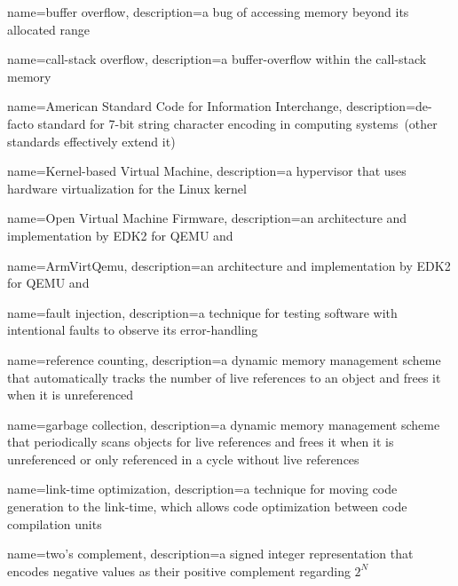 {
  name={buffer overflow},
  description={a bug of accessing memory beyond its allocated range}
}

{
  name={\gls{call-stack} overflow},
  description={a \gls{buffer-overflow} within the \gls{call-stack} memory}
}

{
  name={American Standard Code for Information Interchange},
  description={de-facto standard for 7-bit string character encoding in computing systems~(other standards effectively extend it)}
}

{
  name={Kernel-based Virtual Machine},
  description={a hypervisor that uses hardware virtualization for the Linux kernel}
}

{
  name={Open Virtual Machine Firmware},
  description={an  architecture  and  implementation by \gls{EDK2} for QEMU and }
}

{
  name={ArmVirtQemu},
  description={an  architecture  and  implementation by \gls{EDK2} for QEMU and  }
}

{
  name={fault injection},
  description={a technique for testing software with intentional faults to observe its error-handling}
}

{
  name={reference counting},
  description={a dynamic memory management scheme that automatically tracks the number of live references to an object and frees it when it is unreferenced}
}

{
  name={garbage collection},
  description={a dynamic memory management scheme that periodically scans objects for live references and frees it when it is unreferenced or only referenced in a cycle without live references}
}

{
  name={link-time optimization},
  description={a technique for moving code generation to the link-time, which allows code optimization between code compilation units}
}

{
  name={two's complement},
  description={a signed integer representation that encodes negative values as their positive complement regarding $2^N$}
}

